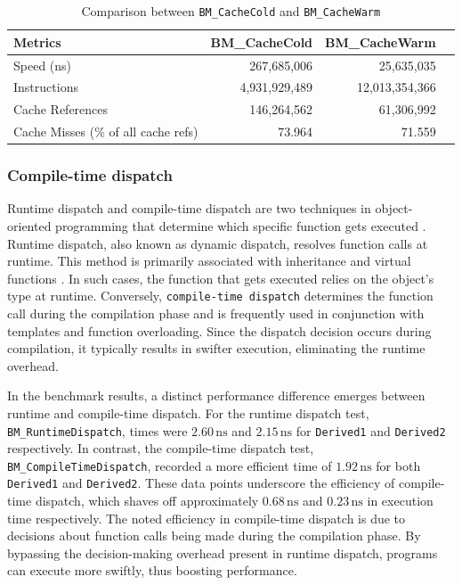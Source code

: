 \documentclass{article}
\theoremstyle{break}
\begin{document}
\begin{table}[htbp]
\centering
\begin{tabular}{lrrr}
\toprule
\textbf{Metrics} & \textbf{BM\_CacheCold} & \textbf{BM\_CacheWarm} \\
\midrule
Speed (ns)     & 267,685,006  & 25,635,035  \\
Instructions     & 4,931,929,489 & 12,013,354,366   \\
Cache References   & 146,264,562  & 61,306,992   \\
Cache Misses (\% of all cache refs)& 73.964 & 71.559  \\
\bottomrule
\end{tabular}
\caption{Comparison between \texttt{BM\_CacheCold} and \texttt{BM\_CacheWarm}}
\label{tab:comparison}
\end{table}



\subsubsection*{Compile-time dispatch}
Runtime dispatch and compile-time dispatch are two techniques in object-oriented programming that determine which specific function gets executed \cite{grothoff}. Runtime dispatch, also known as dynamic dispatch, resolves function calls at runtime. This method is primarily associated with inheritance and virtual functions \cite{cardelli}. In such cases, the function that gets executed relies on the object's type at runtime. Conversely, \texttt{compile-time dispatch} determines the function call during the compilation phase and is frequently used in conjunction with templates and function overloading. Since the dispatch decision occurs during compilation, it typically results in swifter execution, eliminating the runtime overhead.

In the benchmark results, a distinct performance difference emerges between runtime and compile-time dispatch. For the runtime dispatch test, \texttt{BM\_RuntimeDis\-patch}, times were \(2.60\, \text{ns}\) and \(2.15\, \text{ns}\) for \texttt{Derived1} and \texttt{Derived2} respectively. In contrast, the compile-time dispatch test, \texttt{BM\_CompileTimeDispatch}, recorded a more efficient time of \(1.92\, \text{ns}\) for both \texttt{Derived1} and \texttt{Derived2}. These data points underscore the efficiency of compile-time dispatch, which shaves off approximately \(0.68\, \text{ns}\) and \(0.23\, \text{ns}\) in execution time respectively. The noted efficiency in compile-time dispatch is due to decisions about function calls being made during the compilation phase. By bypassing the decision-making overhead present in runtime dispatch, programs can execute more swiftly, thus boosting performance.
\end{document}
